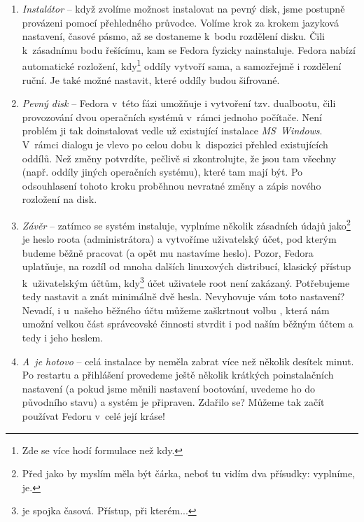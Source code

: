 \begin{enumerate}
\item\emph{Instalátor} -- když zvolíme možnost instalovat na pevný disk, jsme postupně provázeni pomocí přehledného průvodce. Volíme krok za krokem jazyková nastavení, časové pásmo, až se dostaneme k~bodu rozdělení disku. Čili k~zásadnímu bodu řešícímu, kam se Fedora fyzicky nainstaluje. Fedora nabízí automatické rozložení, kdy\footnote{Zde se více hodí formulace  než kdy.}%
oddíly vytvoří sama, a samozřejmě i rozdělení ruční. Je také možné nastavit, které oddíly budou šifrované.

\item\emph{Pevný disk} -- Fedora v~této fázi umožňuje i vytvoření tzv. dualbootu, čili provozování dvou operačních systémů v~rámci jednoho počítače. Není problém ji tak doinstalovat vedle už existující instalace \emph{MS~Windows}. V~rámci dialogu je vlevo po celou dobu k~dispozici přehled existujících oddílů. Než změny potvrdíte, pečlivě si zkontrolujte, že jsou tam všechny (např. oddíly jiných operačních systému), které tam mají být. Po odsouhlasení tohoto kroku proběhnou nevratné změny a zápis nového rozložení na disk.

\item\emph{Závěr} -- zatímco se systém instaluje, vyplníme několik zásadních údajů jako\footnote{Před jako by myslím měla být čárka, neboť tu vidím dva přísudky: vyplníme, je.}%
je heslo roota (administrátora) a vytvoříme uživatelský účet, pod kterým budeme běžně pracovat (a opět mu nastavíme heslo). Pozor, Fedora uplatňuje, na rozdíl od mnoha dalších linuxových distribucí, klasický přístup k~uživatelským účtům, kdy\footnote{ je spojka časová. Přístup, při kterém...}%
účet uživatele root není zakázaný. Potřebujeme tedy nastavit a znát minimálně dvě hesla. Nevyhovuje vám toto nastavení? Nevadí, i u~našeho běžného účtu můžeme zaškrtnout volbu , která nám umožní velkou část správcovské činnosti stvrdit i pod naším běžným účtem a tedy i jeho heslem.

\item\emph{A~je hotovo} -- celá instalace by neměla zabrat více než několik desítek minut. Po restartu a přihlášení provedeme ještě několik krátkých poinstalačních nastavení (a pokud jsme měnili nastavení bootování, uvedeme ho do původního stavu) a systém je připraven. Zdařilo se? Můžeme tak začít používat Fedoru v~celé její kráse!
\end{enumerate}
